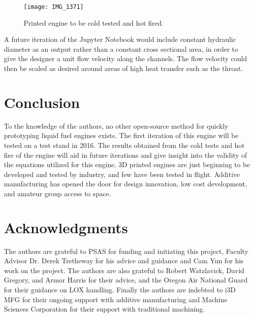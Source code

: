 \documentclass[]{aiaa-tc}%
\begin{document}
\begin{figure}[ht!]
\centering
    {\texttt{[image: IMG\_1371]}}
    \caption{Printed engine to be cold tested and hot fired.}
    \label{fig:IMG_1371}
\end{figure}


A future iteration of the Jupyter Notebook would include constant hydraulic diameter as an output rather than a constant cross sectional area, in order to give the designer a unit flow velocity along the channels. The flow velocity could then be scaled as desired around areas of high heat transfer such as the throat.


\section{Conclusion} %
To the knowledge of the authors, no other open-source method for quickly prototyping liquid fuel engines exists. The first iteration of this engine will be tested on a test stand in 2016. The results obtained from the cold tests and hot fire of the engine will aid in future iterations and give insight into the validity of the equations utilized for this engine. 3D printed engines are just beginning to be developed and tested by industry, and few have been tested in flight. Additive manufacturing has opened the door for design innovation, low cost development, and amateur group access to space.






\section*{Acknowledgments}
The authors are grateful to PSAS for funding and initiating this project, Faculty Advisor Dr. Derek Tretheway for his advice and guidance and Cam Yun for his work on the project. The authors are also grateful to Robert Watzlavick, David Gregory, and Armor Harris for their advice, and the Oregon Air National Guard for their guidance on LOX handling. Finally the authors are indebted to i3D MFG for their ongoing support with additive manufacturing and Machine Sciences Corporation for their support with traditional machining.



\end{document}
